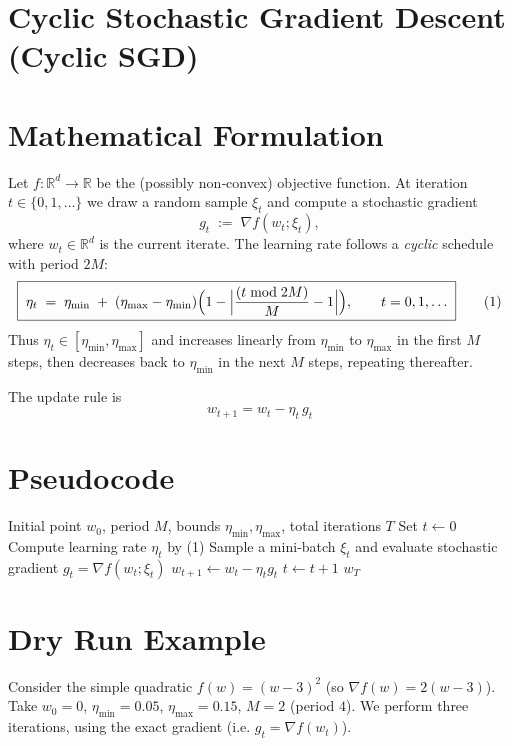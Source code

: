 \documentclass{article}
\newcommand{\RR}{\mathbb{R}}
\begin{document}
\section*{Cyclic Stochastic Gradient Descent (Cyclic SGD)}

\section*{Mathematical Formulation}
Let $f:\RR^{d}\!\to\!\RR$ be the (possibly non‑convex) objective function.  
At iteration $t\in\{0,1,\dots\}$ we draw a random sample $\xi_t$ and compute a stochastic gradient
\[
g_t \;:=\; \nabla f(w_t;\xi_t),
\]
where $w_t\in\RR^{d}$ is the current iterate.  
The learning rate follows a \emph{cyclic} schedule with period $2M$:
\[
\boxed{\;
\eta_t \;=\; \eta_{\min}
        \;+\; (\eta_{\max}-\eta_{\min})
        \Bigl(1-\Bigl|\frac{(t\bmod 2M)}{M}-1\Bigr|\Bigr),
\qquad t=0,1,\dots
\;}
\tag{1}
\]
Thus $\eta_t\in[\eta_{\min},\eta_{\max}]$ and increases linearly from $\eta_{\min}$ to $\eta_{\max}$ in the first $M$ steps, then decreases back to $\eta_{\min}$ in the next $M$ steps, repeating thereafter.

The update rule is
\[
\boxed{\, w_{t+1}= w_t - \eta_t\, g_t \, } \tag{2}
\]

\section*{Pseudocode}
\begin{algorithm}[H]
\caption{Cyclic SGD}
\begin{algorithmic}[1]
\Require Initial point $w_0$, period $M$, bounds $\eta_{\min},\eta_{\max}$, total iterations $T$
\State Set $t\gets 0$
    \State Compute learning rate $\eta_t$ by (1)   
    \State Sample a mini‑batch $\xi_t$ and evaluate stochastic gradient $g_t=\nabla f(w_t;\xi_t)$
    \State $w_{t+1}\gets w_t-\eta_t g_t$                
    \State $t\gets t+1$
\EndWhile
\State \Return $w_T$
\end{algorithmic}
\end{algorithm}

\section*{Dry Run Example}
Consider the simple quadratic $f(w)=(w-3)^2$ (so $\nabla f(w)=2(w-3)$).  
Take $w_0=0$, $\eta_{\min}=0.05$, $\eta_{\max}=0.15$, $M=2$ (period $4$).  
We perform three iterations, using the exact gradient (i.e. $g_t=\nabla f(w_t)$).
\end{document}
